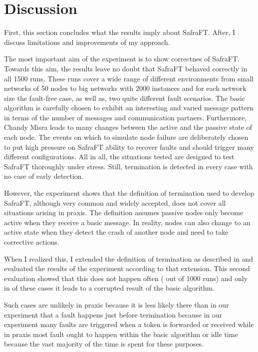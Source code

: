 \section{Discussion}
First, this section concludes what the results imply about SafraFT. After, I discuss limitations and improvements of my approach.

The most important aim of the experiment is to show correctnes of SafraFT.
Towards this aim, the results leave no doubt that SafraFT behaved correctly in all 1500
runs.
These runs cover a wide range of different environments from small networks of 50 nodes to big networks with 2000 instances and for each network size the fault-free case, as well as, two quite different fault scenarios.
The basic algorithm is carefully chosen to exhibit an interesting and varied message pattern in terms of the number of messages and communication partners.
Furthermore, Chandy Misra leads to many changes between the active and the passive state of each node.
The events on which to simulate node failure are deliberately chosen to put high pressure on SafraFT ability to recover faults and should trigger many different configurations.
All in all, the situations tested are designed to test SafraFT thoroughly under stress.
Still, termination is detected in every case with no case of early detection.

However, the experiment shows that the definition of termination used to develop SafraFT, although very common and widely accepted, does not cover all situations arising in praxis.
The definition assumes passive nodes only become active when they receive a basic message.
In reality, nodes can also change to an active state when they detect the crash of another node and need to take corrective actions.

When I realized this, I extended the definition of termination as described in \label{extended-definition} and evaluated the results of the experiment according to that extension.
This second evaluation showed that this does not happen often ( out of 1000 runs) and only in  of these cases it leads to a corrupted result of the basic algorithm.

Such cases are unlikely in praxis because it is less likely there than in our experiment that a fault happens just before termination because in our experiment many faults are triggered when a token is forwarded or received while in praxis most fault ought to happen within the basic algorithm or idle time because the vast majority of the time is spent for these purposes.

